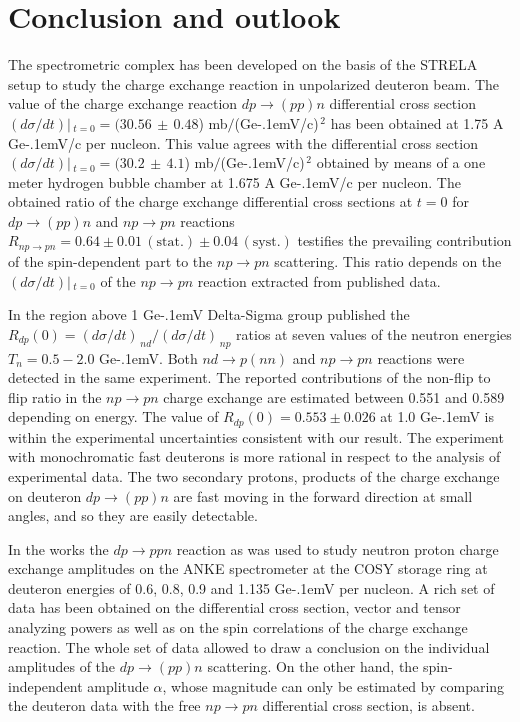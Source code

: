 \documentclass[twocolumn,epjc3]{svjour3}
\newcommand{\np}     {\ensuremath{np \rightarrow pn}\xspace}
\newcommand{\dpfrag} {\ensuremath{dp \rightarrow ppn}\xspace}
\newcommand{\dpchex} {\ensuremath{dp \rightarrow (pp)n}\xspace}
\newcommand{\GeVc}   {Ge\kern-.1emV/c\xspace}
\newcommand{\GeV}    {Ge\kern-.1emV\xspace}
\begin{document}
\section{Conclusion and outlook}
The spectrometric complex has been developed on the basis of the STRELA setup to
study the charge exchange reaction in unpolarized deuteron beam. The value of
the charge exchange reaction \dpchex differential cross section
$(d\sigma/dt)|\,_{t=0}=(30.56\,\pm\,0.48$) mb$/$(\GeVc)$^{\,2}$ has been
obtained at 1.75 A \GeVc per nucleon. This value agrees with the differential
cross section $(d\sigma/dt)|\,_{t=0}=(30.2\,\pm\,4.1$) mb$/$(\GeVc)$^{\,2}$
obtained by means of a one meter hydrogen bubble chamber at 1.675 A \GeVc per
nucleon. The obtained ratio of the charge exchange differential cross sections
at $t=0$ for \dpchex and \np reactions
$R_{\np} = 0.64 \pm 0.01\,\mathrm{(stat.)} \pm 0.04\,\mathrm{(syst.)}$ testifies
the prevailing contribution of the spin-dependent part to the \np scattering.
This ratio depends on the $(d\sigma/dt)|\,_{t=0}$ of the \np reaction extracted
from published data.

In the region above 1 \GeV Delta-Sigma group published the
$R_{dp}(0) = (d\sigma/dt)_{\,nd} / (d\sigma/dt)_{\,np}$ ratios
\cite{sha09,sha09_2,shi11} at seven values of the neutron energies
$T_n = 0.5 - 2.0$ \GeV. Both $nd \rightarrow p(nn)$ and \np reactions were
detected in the same experiment. The reported contributions of the non-flip to
flip ratio in the \np charge exchange are estimated between 0.551 and 0.589
depending on energy. The value of $R_{dp}(0) = 0.553 \pm 0.026$ at 1.0 \GeV
\cite{sha09} is within the experimental uncertainties consistent with our
result. The experiment with monochromatic fast deuterons is more rational in
respect to the analysis of experimental data. The two secondary protons,
products of the charge exchange on deuteron \dpchex are fast moving in the
forward direction at small angles, and so they are easily detectable.

In the works \cite{chi09,mch13} the \dpfrag reaction as was used to study
neutron proton charge exchange amplitudes on the ANKE spectrometer at the COSY
storage ring at deuteron energies of 0.6, 0.8, 0.9 and 1.135 \GeV per nucleon.
A rich set of data has been obtained on the differential cross section, vector
and tensor analyzing powers as well as on the spin correlations of the charge
exchange reaction. The whole set of data allowed to draw a conclusion on the
individual amplitudes of the \dpchex scattering. On the other hand, the
spin-independent amplitude $\alpha$, whose magnitude can only be estimated by
comparing the deuteron data with the free \np differential cross section, is
absent.
\end{document}
